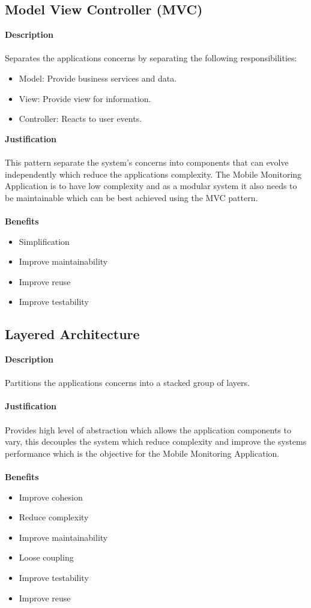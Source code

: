 \documentclass[hidelinks, 12pt, oneside]{article}
\begin{document}
    \subsection{Model View Controller (MVC)}
    \textbf{Description}\\\\
    Separates the applications concerns by separating the following responsibilities:
    \begin{itemize}
    \item Model: Provide business services and data.
    \item View: Provide view for information.
    \item Controller: Reacts to user events. 
    \end{itemize}
    \textbf{Justification}\\\\
    This pattern separate the system's concerns into components that can evolve independently which reduce the applications complexity. The Mobile Monitoring Application is to have low complexity and as a modular system it also needs to be maintainable which can be best achieved using the MVC pattern. \\\\
    \textbf{Benefits}
    \begin{itemize}
    \item Simplification
    \item Improve maintainability
    \item Improve reuse
    \item Improve testability 
	\end{itemize} 
	
	\newpage
	\subsection{Layered Architecture}
	\textbf{Description}\\\\
	Partitions the applications concerns into a stacked group of layers.\\\\
	\textbf{Justification}\\\\
	Provides high level of abstraction which allows the application components to vary, this decouples the system which reduce complexity and improve the systems performance which is the objective for the Mobile Monitoring Application.\\\\
	\textbf{Benefits}
	\begin{itemize}
	\item Improve cohesion
	\item Reduce complexity
	\item Improve maintainability
	\item Loose coupling
	\item Improve testability
	\item Improve reuse
	\end{itemize}
	\newpage
\end{document}
